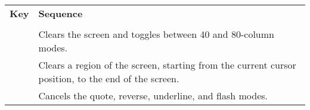 \begin{center}
\begin{longtable}{c|L{5.5cm}}
	\textbf{Key} & \textbf{Sequence}\\
  \hhline{==}
	\endhead

   \\
  \hhline{==}
  &
Clears the screen and toggles between 40 and 80-column modes.\\
\hline
{}  &
Clears a region of the screen, starting from the current cursor position, to the end of the screen.\\
\hline
{}  &
Cancels the quote, reverse, underline, and flash modes.\\


\end{longtable}
\end{center}
